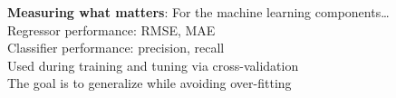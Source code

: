 

   
    \begin{block}{\textbf{Measuring what matters}: }
        \alert<2>{For the machine learning components\ldots}\\
        \alert<3>{Regressor performance: RMSE, MAE} \\
        \alert<4>{Classifier performance: precision, recall} \\
        \alert<5>{Used during training and tuning via cross-validation} \\
        \alert<6>{The goal is to generalize while avoiding over-fitting} 
    \end{block}